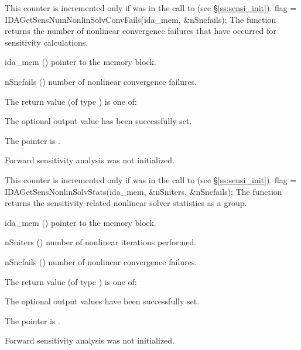 {
  This counter is incremented only if  was 
  in the call to  (see \S\ref{ss:sensi_init}).
}
{
  flag = IDAGetSensNumNonlinSolvConvFails(ida\_mem, \&nSncfails);
}
{
  The function  returns the
  number of nonlinear convergence failures that have occurred for
  sensitivity calculations.
}
{
  \begin{args}
  \item[ida\_mem] ()
    pointer to the {\idas} memory block.
  \item[nSncfails] ()
    number of nonlinear convergence failures.
  \end{args}
}
{
  The return value  (of type ) is one of:
  \begin{args}
  \item[\Id{IDA\_SUCCESS}] 
    The optional output value has been successfully set.
  \item[\Id{IDA\_MEM\_NULL}]
    The  pointer is .
  \item[\Id{IDA\_NO\_SENS}]
    Forward sensitivity analysis was not initialized.
  \end{args}
}
{
  This counter is incremented only if  was 
  in the call to  (see \S\ref{ss:sensi_init}).
}
{
  flag = IDAGetSensNonlinSolvStats(ida\_mem, \&nSniters, \&nSncfails);
}
{
  The function  returns the sensitivity-related
  nonlinear solver statistics as a group.
}
{
  \begin{args}
  \item[ida\_mem] ()
    pointer to the {\idas} memory block.
  \item[nSniters] ()
    number of nonlinear iterations performed.
  \item[nSncfails] ()
    number of nonlinear convergence failures.
  \end{args}
}
{
  The return value  (of type ) is one of:
  \begin{args}
  \item[\Id{IDA\_SUCCESS}] 
    The optional output values have been successfully set.
  \item[\Id{IDA\_MEM\_NULL}]
    The  pointer is .
  \item[\Id{IDA\_NO\_SENS}]
    Forward sensitivity analysis was not initialized.
  \end{args}
}
{}
